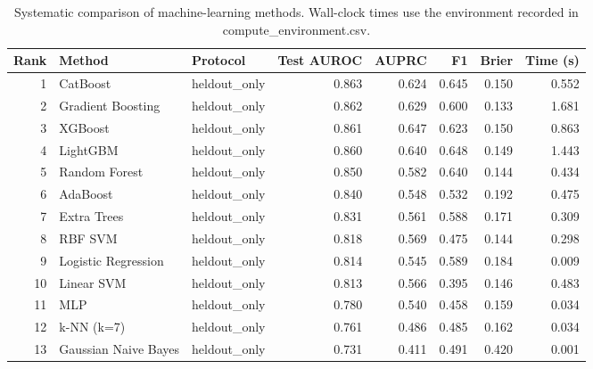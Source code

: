 \begin{table}[htbp]
\centering
\caption{Systematic comparison of machine-learning methods. Wall-clock times use the environment recorded in compute_environment.csv.}
\label{tab:method_comparison_recomputed}
\begin{tabular}{rllrrrrr}
\toprule
Rank & Method & Protocol & Test AUROC & AUPRC & F1 & Brier & Time (s) \\
\midrule
1 & CatBoost & heldout\_only & 0.863 & 0.624 & 0.645 & 0.150 & 0.552 \\
2 & Gradient Boosting & heldout\_only & 0.862 & 0.629 & 0.600 & 0.133 & 1.681 \\
3 & XGBoost & heldout\_only & 0.861 & 0.647 & 0.623 & 0.150 & 0.863 \\
4 & LightGBM & heldout\_only & 0.860 & 0.640 & 0.648 & 0.149 & 1.443 \\
5 & Random Forest & heldout\_only & 0.850 & 0.582 & 0.640 & 0.144 & 0.434 \\
6 & AdaBoost & heldout\_only & 0.840 & 0.548 & 0.532 & 0.192 & 0.475 \\
7 & Extra Trees & heldout\_only & 0.831 & 0.561 & 0.588 & 0.171 & 0.309 \\
8 & RBF SVM & heldout\_only & 0.818 & 0.569 & 0.475 & 0.144 & 0.298 \\
9 & Logistic Regression & heldout\_only & 0.814 & 0.545 & 0.589 & 0.184 & 0.009 \\
10 & Linear SVM & heldout\_only & 0.813 & 0.566 & 0.395 & 0.146 & 0.483 \\
11 & MLP & heldout\_only & 0.780 & 0.540 & 0.458 & 0.159 & 0.034 \\
12 & k-NN (k=7) & heldout\_only & 0.761 & 0.486 & 0.485 & 0.162 & 0.034 \\
13 & Gaussian Naive Bayes & heldout\_only & 0.731 & 0.411 & 0.491 & 0.420 & 0.001 \\
\bottomrule
\end{tabular}

\end{table}
